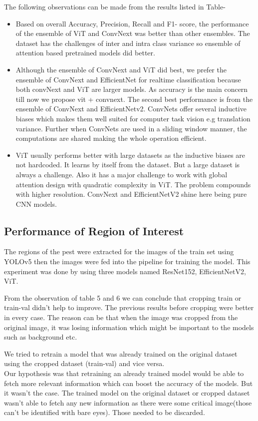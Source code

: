 The following observations can be made from the results listed in Table-
\begin{itemize}
    \item Based on overall Accuracy, Precision, Recall and F1- score, the performance of the ensemble of ViT and ConvNext was better than other ensembles. The dataset has the challenges of inter and intra class variance so ensemble of attention based pretrained models did better.
    \item Although the ensemble of ConvNext and ViT did best, we prefer the ensemble of ConvNext and EfficientNet for realtime classification because both convNext and ViT are larger models. As accuracy is the main concern till now we propose vit + convnext. The second best performance is from the ensemble of ConvNext and EfficientNetv2. ConvNets offer several inductive biases which makes them well suited for computer task vision e.g translation variance. Further when ConvNets are used in a sliding window manner, the computations are shared making the whole operation efficient.
    \item ViT usually performs better with large datasets as the inductive biases are not hardcoded. It learns by itself from the dataset. But a large dataset is always a challenge. Also it has a major challenge to work with global attention design with quadratic complexity in ViT. The problem compounds with higher resolution. ConvNext and EfficientNetV2 shine here being pure CNN models.
\end{itemize}

\subsection{Performance of Region of Interest}
The regions of the pest were extracted for the images of the train set using YOLOv5 then the images were fed into the pipeline for training the model. This experiment was done by using three models named ResNet152, EfficientNetV2, ViT. 

From the observation of table 5 and 6 we can conclude that cropping train or train-val didn’t help to improve. The previous results before cropping were better in every case. The reason can be that when the image was cropped from the original image, it was losing information which might be important to the models such as background etc.

We tried to retrain a model that was already trained on the original dataset using the cropped dataset (train-val) and vice versa.\\

Our hypothesis was that retraining an already trained model would be able to fetch more relevant information which can boost the accuracy of the models. But it wasn’t the case. The trained model on the original dataset or cropped dataset wasn’t able to fetch any new information as there were some critical image(those can’t be identified with bare eyes). Those needed to be discarded.


